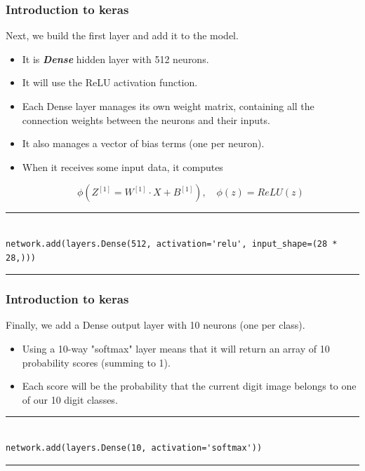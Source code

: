\documentclass[11pt]{beamer}
\begin{document}
\begin{frame}[fragile]
\frametitle{Introduction to keras}

Next, we build the first layer and add it to the model. 
\begin{itemize}
\item It is \textbf{\textit{Dense}} hidden layer with 512 neurons. 
\item It will use the ReLU activation function. 
\item Each Dense layer manages its own weight matrix, containing all the connection weights between the neurons and their inputs. 
\item It also manages a vector of bias terms (one per neuron). 
\item When it receives some input data, it computes 

$$\phi \left( Z^{[1]} = W^{[1]} \cdot X + B^{[1]} \right), \quad \phi(z) = \textit{ReLU}(z)$$
\end{itemize}
\rule{\textwidth}{1pt}
\scriptsize
\begin{verbatim}

network.add(layers.Dense(512, activation='relu', input_shape=(28 * 28,)))

\end{verbatim}
\rule{\textwidth}{1pt}

\end{frame}
%
%
\begin{frame}[fragile]
\frametitle{Introduction to keras}

Finally, we add a Dense output layer with 10 neurons (one per class). 
\begin{itemize}
\item Using a 10-way "softmax" layer means that it will return an array of 10 probability scores (summing to 1). 
\item Each score will be the probability that the current digit image belongs to one of our 10 digit classes.
\end{itemize}

\rule{\textwidth}{1pt}
\scriptsize
\begin{verbatim}

network.add(layers.Dense(10, activation='softmax'))

\end{verbatim}
\rule{\textwidth}{1pt}
\end{frame}
%
%
\end{document}
